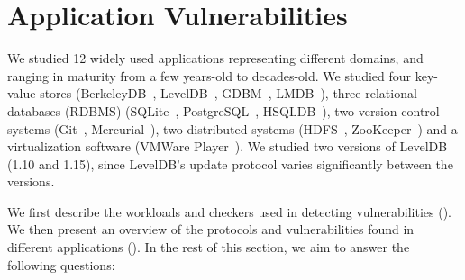 \section{Application Vulnerabilities} 
\label{sec-vul-study} 

We studied 12 widely used applications representing different domains, and
ranging in maturity from a few years-old to decades-old.  We studied four
key-value stores (BerkeleyDB~\cite{bdb}, LevelDB~\cite{leveldb},
GDBM~\cite{gdbm}, LMDB~\cite{lmdb}), three relational databases (RDBMS)
(SQLite~\cite{sqlite}, PostgreSQL~\cite{postgres}, HSQLDB~\cite{hsqldb}), two
version control systems (Git~\cite{git}, Mercurial~\cite{mercurial}), two
distributed systems (HDFS~\cite{Shvachko+10-HDFS}, ZooKeeper~\cite{zookeeper})
and a virtualization software (VMWare Player~\cite{vmwareplayer}). We studied two
versions of LevelDB (1.10 and 1.15), since LevelDB's update protocol varies
significantly between the versions.

We first describe the workloads and checkers used in detecting vulnerabilities
(). We then present an overview of the protocols and
vulnerabilities found in different applications (). In the rest
of this section, we aim to answer the following questions:

